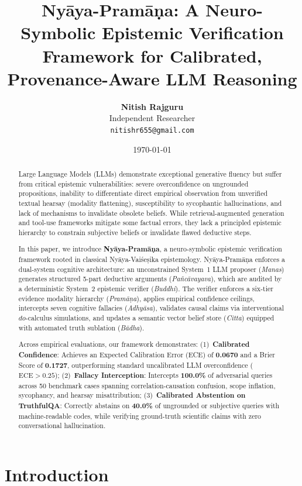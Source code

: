 \documentclass[11pt,a4paper]{article}
\title{\textbf{Ny\=aya-Pram\=a\d{n}a: A Neuro-Symbolic Epistemic Verification Framework for Calibrated, Provenance-Aware LLM Reasoning}}
\author{
  \textbf{Nitish Rajguru} \\
  Independent Researcher \\
  \texttt{nitishr655@gmail.com}
}
\date{\today}
\begin{document}
\maketitle

\begin{abstract}
Large Language Models (LLMs) demonstrate exceptional generative fluency but suffer from critical epistemic vulnerabilities: severe overconfidence on ungrounded propositions, inability to differentiate direct empirical observation from unverified textual hearsay (modality flattening), susceptibility to sycophantic hallucinations, and lack of mechanisms to invalidate obsolete beliefs. While retrieval-augmented generation and tool-use frameworks mitigate some factual errors, they lack a principled epistemic hierarchy to constrain subjective beliefs or invalidate flawed deductive steps.

In this paper, we introduce \textbf{Ny\=aya-Pram\=a\d{n}a}, a neuro-symbolic epistemic verification framework rooted in classical Ny\=aya-Vai\'se\d{s}ika epistemology. Ny\=aya-Pram\=a\d{n}a enforces a dual-system cognitive architecture: an unconstrained System~1 LLM proposer (\textit{Manas}) generates structured 5-part deductive arguments (\textit{Pa\~nc\=avayava}), which are audited by a deterministic System~2 epistemic verifier (\textit{Buddhi}). The verifier enforces a six-tier evidence modality hierarchy (\textit{Pram\=a\d{n}a}), applies empirical confidence ceilings, intercepts seven cognitive fallacies (\textit{Adhy\=asa}), validates causal claims via interventional $do$-calculus simulations, and updates a semantic vector belief store (\textit{Citta}) equipped with automated truth sublation (\textit{B\=adha}).

Across empirical evaluations, our framework demonstrates:
(1)~\textbf{Calibrated Confidence}: Achieves an Expected Calibration Error (ECE) of \textbf{0.0670} and a Brier Score of \textbf{0.1727}, outperforming standard uncalibrated LLM overconfidence ($\text{ECE} > 0.25$);
(2)~\textbf{Fallacy Interception}: Intercepts \textbf{100.0\%} of adversarial queries across 50 benchmark cases spanning correlation-causation confusion, scope inflation, sycophancy, and hearsay misattribution;
(3)~\textbf{Calibrated Abstention on TruthfulQA}: Correctly abstains on \textbf{40.0\%} of ungrounded or subjective queries with machine-readable codes, while verifying ground-truth scientific claims with zero conversational hallucination.
\end{abstract}

\section{Introduction}
\end{document}
